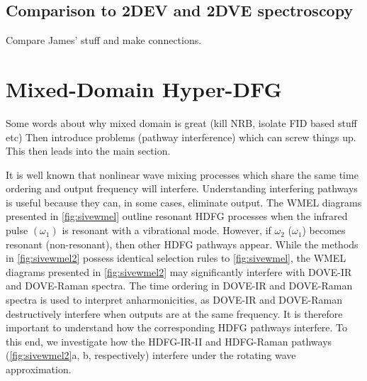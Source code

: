 \documentclass[aip, jcp, reprint, onecolumn]{revtex4-2}
\begin{document}
\subsection{Comparison to 2DEV and 2DVE spectroscopy}
Compare James' stuff and make connections.


\section{Mixed-Domain Hyper-DFG}
Some words about why mixed domain is great (kill NRB, isolate FID based stuff etc)
Then introduce problems (pathway interference) which can screw things up. This then leads into the main section.

It is well known that nonlinear wave mixing processes which share the same time ordering and output frequency will interfere. \cite{RN135, Bonn2024}
Understanding interfering pathways is useful because they can, in some cases, eliminate output. \cite{RN342, RN135}
The WMEL diagrams presented in \autoref{fig:sivewmel} outline resonant HDFG processes when the infrared pulse $(\omega_1)$ is resonant with a vibrational mode. 
However, if $\omega_2$ ($\omega_1$) becomes resonant (non-resonant), then other HDFG pathways appear.\cite{McDonnell2024} 
While the methods in \autoref{fig:sivewmel2} possess identical selection rules to \autoref{fig:sivewmel}, the WMEL diagrams presented in \autoref{fig:sivewmel2} may significantly interfere with DOVE-IR and DOVE-Raman spectra.
The time ordering in DOVE-IR and DOVE-Raman spectra is used to interpret anharmonicities, as DOVE-IR and DOVE-Raman destructively interfere when outputs are at the same frequency. \cite{RN135, RN324}
It is therefore important to understand how the corresponding HDFG pathways interfere.
To this end, we investigate how the HDFG-IR-II and HDFG-Raman pathways (\autoref{fig:sivewmel2}a, b, respectively) interfere under the rotating wave approximation. 
\end{document}
